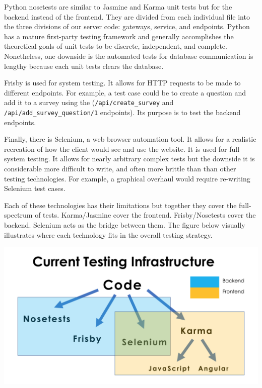 \documentclass[12pt]{report}
\begin{document}
\par\noindent
Python nosetests are similar to Jasmine and Karma unit tests but for the backend instead of the frontend. They are divided from each individual file into the three divisions of our server code: gateways, service, and endpoints. Python has a mature first-party testing framework and generally accomplishes the theoretical goals of unit tests to be discrete, independent, and complete. Nonetheless, one downside is the automated tests for database communication is lengthy because each unit tests clears the database.

\par\noindent
Frisby is used for system testing. It allows for HTTP requests to be made to different endpoints. For example, a test case could be to create a question and add it to a survey using the (\texttt{/api/create\_survey} and \texttt{/api/add\_survey\_question/1} endpoints). Its purpose is to test the backend endpoints.

\par\noindent
Finally, there is Selenium, a web browser automation tool. It allows for a realistic recreation of how the client would see and use the website. It is used for full system testing. It allows for nearly arbitrary complex tests but the downside it is considerable more difficult to write, and often more brittle than than other testing technologies. For example, a graphical overhaul would require re-writing Selenium test cases.

\par\noindent
Each of these technologies has their limitations but together they cover the full-spectrum of tests. Karma/Jasmine cover the frontend. Frisby/Nosetests cover the backend. Selenium acts as the bridge between them. The figure below visually illustrates where each technology fits in the overall testing strategy.

\begin{center}
\includegraphics[scale=0.3]{infra}
\end{center}
\end{document}
